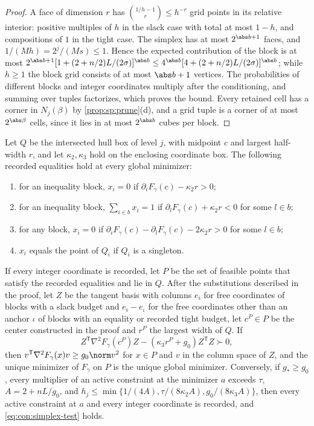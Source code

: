 \begin{proof}
A face of dimension $r$ has $\binom{1/h-1}{r}\le h^{-r}$ grid points in its
relative interior: positive multiples of $h$ in the slack case with total at
most $1-h$, and compositions of $1$ in the tight case. The simplex has at most
$2^{\abs b+1}$ faces, and $1/(Mh)=2^j/(Ms)\le1$. Hence the expected
contribution of the block is at most
$2^{\abs b+1}[1+(2+n/2)L/(2\sigma)]^{\abs b}\le4^{\abs b}[4+(2+n/2)L/(2\sigma)]^{\abs b}$;
while $h\ge1$ the block grid consists of at most $\abs b+1$ vertices. The
probabilities of different blocks and integer coordinates multiply after the
conditioning, and summing over tuples factorizes, which proves the bound.
Every retained cell has a corner in $N_j(\beta)$ by \cref{prop:sp:prune}(d),
and a grid tuple is a corner of at most $2^{\abs\beta}$ cells, since it lies in
at most $2^{\abs b}$ cubes per block.
\end{proof}

\begin{lemma}\label{lem:con:simplex-close}
Let $Q$ be the intersected hull box of level $j$, with midpoint $c$ and
largest half-width $r$, and let $\kappa_2,\kappa_3$ hold on the enclosing
coordinate box. The following recorded equalities hold at every global
minimizer:
\begin{enumerate}[label=(\alph*)]
\item for an inequality block, $x_i=0$ if $\partial_iF_\gamma(c)-\kappa_2r>0$;
\item for an inequality block, $\sum_{i\in b}x_i=1$ if
$\partial_lF_\gamma(c)+\kappa_2r<0$ for some $l\in b$;
\item for any block, $x_i=0$ if
$\partial_iF_\gamma(c)-\partial_lF_\gamma(c)-2\kappa_2r>0$ for some $l\in b$;
\item $x_i$ equals the point of $Q_i$ if $Q_i$ is a singleton.
\end{enumerate}
If every integer coordinate is recorded, let $P$ be the set of feasible
points that satisfy the recorded equalities and lie in $Q$. After the
substitutions described in the proof, let $Z$ be the tangent basis with
columns $e_i$ for free coordinates of blocks with a slack budget and
$e_i-e_{\iota}$ for the free coordinates other than an anchor $\iota$ of blocks
with an equality or recorded tight budget, let $c^P\in P$ be the center
constructed in the proof and $r^P$ the largest width of $Q$. If
\begin{equation}\label{eq:con:simplex-test}
 Z^{\mathsf T}\nabla^2F_\gamma(c^P)Z-(\kappa_3r^P+g_0)Z^{\mathsf T}Z\succ0,
\end{equation}
then $v^{\mathsf T}\nabla^2F_\gamma(x)v\ge g_0\norm v^2$ for $x\in P$ and $v$ in
the column space of $Z$, and the unique minimizer of $F_\gamma$ on $P$ is the
unique global minimizer. Conversely, if $g_*\ge g_0$, every multiplier of an
active constraint at the minimizer $a$ exceeds $\tau$, $A=2+nL/g_0$, and
$h_j\le\min\{1/(4A),\tau/(8\kappa_2A),g_0/(8\kappa_3A)\}$, then every active
constraint at $a$ and every integer coordinate is recorded, and
\eqref{eq:con:simplex-test} holds.
\end{lemma}

